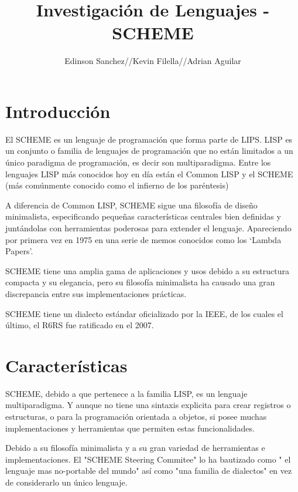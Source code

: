 \documentclass[11pt]{article} %
\title{Investigación de Lenguajes - SCHEME}
\author{Edinson Sanchez//Kevin Filella//Adrian Aguilar}
\begin{document}
\maketitle

\section{Introducción}
El SCHEME es un lenguaje de programación que forma parte de LIPS. LISP es un conjunto o familia de lenguajes de programación que no están limitados a un único paradigma de programación, es decir son multiparadigma. Entre los lenguajes LISP más conocidos hoy en día están el Common LISP y el SCHEME (más comúnmente conocido como el infierno de los paréntesis)

A diferencia de Common LISP, SCHEME sigue una filosofía de diseño minimalista, especificando pequeñas características centrales bien definidas  y juntándolas con herramientas poderosas para extender el lenguaje. Apareciendo por primera vez en 1975 en una serie de memos conocidos como los ‘Lambda Papers’.

SCHEME tiene una amplia gama de aplicaciones y usos debido a su estructura compacta y su elegancia, pero su filosofía minimalista ha causado una gran discrepancia entre sus implementaciones prácticas.

SCHEME tiene un dialecto estándar oficializado por la IEEE, de los cuales el último, el R6RS fue ratificado en el 2007.

\section{Características}

SCHEME, debido a que pertenece a la familia LISP, es un lenguaje multiparadigma. Y aunque no tiene una sintaxis explicita para crear registros o estructuras, o para la programación orientada a objetos, si posee muchas implementaciones y herramientas que permiten estas funcionalidades.

Debido a su filosofía minimalista y a su gran variedad de herramientas e implementaciones. El  "SCHEME Steering Commitee"  lo ha bautizado como " el lenguaje mas no-portable del mundo"  así como "una familia de dialectos" en vez de considerarlo un único lenguaje.
\end{document}
